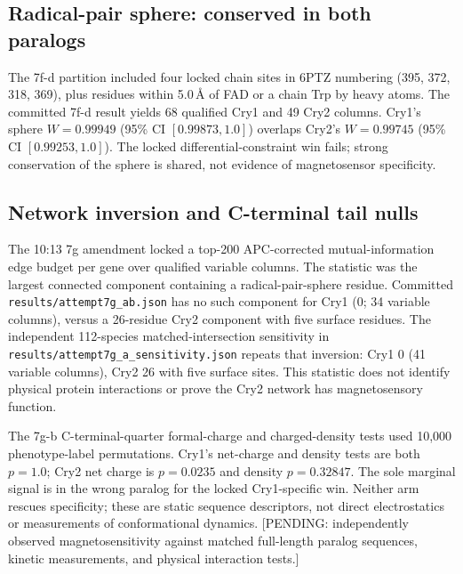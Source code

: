 \subsection{Radical-pair sphere: conserved in both paralogs}
The 7f-d partition included four locked chain sites in 6PTZ numbering (395, 372, 318, 369), plus residues within 5.0\,\AA{} of FAD or a chain Trp by heavy atoms. The committed 7f-d result yields 68 qualified Cry1 and 49 Cry2 columns. Cry1's sphere $W=0.99949$ (95\% CI $[0.99873,1.0]$) overlaps Cry2's $W=0.99745$ (95\% CI $[0.99253,1.0]$). The locked differential-constraint win fails; strong conservation of the sphere is shared, not evidence of magnetosensor specificity.
\subsection{Network inversion and C-terminal tail nulls}
The 10:13 7g amendment locked a top-200 APC-corrected mutual-information edge budget per gene over qualified variable columns. The statistic was the largest connected component containing a radical-pair-sphere residue. Committed \texttt{results/attempt7g\_ab.json} has no such component for Cry1 (0; 34 variable columns), versus a 26-residue Cry2 component with five surface residues. The independent 112-species matched-intersection sensitivity in \texttt{results/attempt7g\_a\_sensitivity.json} repeats that inversion: Cry1 0 (41 variable columns), Cry2 26 with five surface sites. This statistic does not identify physical protein interactions or prove the Cry2 network has magnetosensory function.

The 7g-b C-terminal-quarter formal-charge and charged-density tests used 10,000 phenotype-label permutations. Cry1's net-charge and density tests are both $p=1.0$; Cry2 net charge is $p=0.0235$ and density $p=0.32847$. The sole marginal signal is in the wrong paralog for the locked Cry1-specific win. Neither arm rescues specificity; these are static sequence descriptors, not direct electrostatics or measurements of conformational dynamics. [PENDING: independently observed magnetosensitivity against matched full-length paralog sequences, kinetic measurements, and physical interaction tests.]
